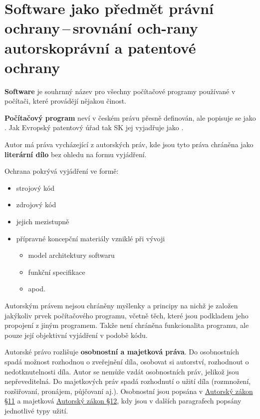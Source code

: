 \section[Software jako předmět právní ochrany\,--\,srovnání ochrany autorskoprávní a patentové ochrany]{Software jako předmět právní ochrany\,--\,srovnání och-rany autorskoprávní a patentové ochrany}

\textbf{Software} je souhrnný název pro všechny počítačové programy používané v počítači, které provádějí nějakou činost.

\textbf{Počítačový program} neví v českém právu přesně definován, ale popisuje se jako . Jak Evropský patentový úřad tak SK jej vyjadřuje jako .

Autor má práva vycházející z autorských práv, kde jsou tyto práva chráněna jako \textbf{literární dílo} bez ohledu na formu vyjádření.

Ochrana pokrývá vyjádření ve formě:
\begin{itemize}[noitemsep]
    \item strojový kód
    \item zdrojový kód
    \item jejich mezistupně
    \item přípravné koncepční materiály vzniklé při vývoji
    \begin{itemize}[noitemsep]
        \item model architektury softwaru
        \item funkční specifikace
        \item apod.
    \end{itemize}
\end{itemize}

Autorským právem nejsou chráněny myšlenky a principy na nichž je založen jakýkoliv prvek počítačového programu, včetně těch, které jsou podkladem jeho propojení z jiným programem. Takže není chráněna funkcionalita programu, ale pouze její objektivní vyjádření v podobě kódu.

Autorské právo rozlišuje \textbf{osobnostní a majetková práva}. Do osobnostních spadá možnost rozhodnou o zveřejnění díla, osobovat si autorství, rozhodnout o nedotknutelnosti díla. Autor se nemůže vzdát osobnostních práv, jelikož jsou nepřeveditelná. Do majetkových práv spadá rozhodnutí o užití díla (rozmnožení, rozšiřovaní, pronájem, půjčovaní aj.). Osobnostní jsou popsána v \href{https://www.zakonyprolidi.cz/cs/2000-121#p11}{Autorský zákon §11} a majetková  \href{https://www.zakonyprolidi.cz/cs/2000-121#p12}{Autorský zákon §12}, kdy jsou v dalších paragrafech popsány jednotlivé typy užití. 

